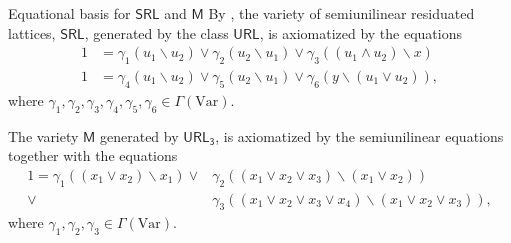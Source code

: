 \documentclass[professionalfont, handout, 12pt]{beamer} %
\theoremstyle{plain}
\theoremstyle{definition}
\newcommand{\m}[1]{{\mathbf {#1} }}
\begin{document}
\begin{frame}{Equational basis for $\mathsf{SRL}$ and $\mathsf{M}$}
    By \cite{galatos2004equational}, the variety of semiunilinear residuated lattices, $\mathsf{SRL}$, generated by the class $\mathsf{URL}$, is axiomatized by the equations
    \begin{align*}
        1 & = \gamma_1(u_1 \backslash u_2) \vee \gamma_2(u_2 \backslash u_1) \vee \gamma_3 ((u_1 \wedge u_2) \backslash x)\\
        1 & = \gamma_4(u_1 \backslash u_2) \vee \gamma_5(u_2 \backslash u_1) \vee \gamma_6 (y \backslash (u_1 \vee u_2)),
    \end{align*}
    where $ \gamma_1, \gamma_2, \gamma_3, \gamma_4, \gamma_5, \gamma_6 \in \Gamma(\text{Var})$.\pause
    \medskip

    The variety $\mathsf{M}$ generated by $\mathsf{URL_3}$, is axiomatized by the semiunilinear equations together with the equations 
    \begin{align*}
        1 = \gamma_1((x_1 \vee x_2)\backslash x_1) \vee & \gamma_2((x_1 \vee x_2 \vee x_3)\backslash (x_1 \vee x_2))\\
        \vee & \gamma_3((x_1 \vee x_2 \vee x_3 \vee x_4) \backslash (x_1 \vee x_2 \vee x_3)),
    \end{align*}
    where $\gamma_1, \gamma_2, \gamma_3 \in \Gamma(\text{Var})$.
\end{frame}

\begin{comment}
\begin{frame}{Finitely subdirectly irreducible algebras in $\mathsf{SRL}$ and $\mathsf{M}$}
    Given a variety $\mathcal{V}$, an algebra $\m A \in \mathcal{V}$ is called (finitely) subdirectly-irreducible if whenever $\m A$ is isomorphic to a subdirect product of a (non-empty finite) set of algebras in $\mathcal{V}$, it is isomorphic to one of these algebras.
    We use $\mathcal{V}_{FSI}$ and $\mathcal{V}_{SI}$ to denote the classes of finitely subdireclty irreducible and subdireclty irreducible members in $\mathcal{V}$ respectively.\pause
    \medskip

    Every algebra in a variety $\mathcal{V}$ is a subalgebra of the direct product of the subdireclty-irreducible members, so $\mathcal{V} = HSP(\mathcal{V}_{SI}) = HSP(\mathcal{V}_{FSI})$.
\end{frame}
\end{comment}
\end{document}
